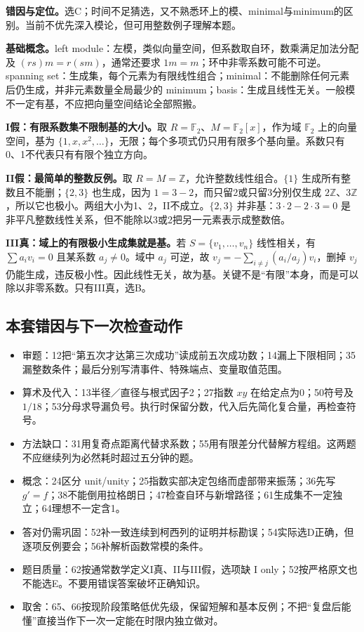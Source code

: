 \documentclass[11pt,a4paper,fontset=fandol]{ctexart}
\begin{document}
\textbf{错因与定位。}选C；时间不足猜选，又不熟悉环上的模、minimal与minimum的区别。当前不优先深入模论，但可用整数例子理解本题。

\textbf{基础概念。}left module：左模，类似向量空间，但系数取自环，数乘满足加法分配及 $(rs)m=r(sm)$，通常还要求 $1m=m$；环中非零系数可能不可逆。spanning set：生成集，每个元素为有限线性组合；minimal：不能删除任何元素后仍生成，并非元素数量全局最少的 minimum；basis：生成且线性无关。一般模不一定有基，不应把向量空间结论全部照搬。

\textbf{I假：有限系数集不限制基的大小。}取 $R=\mathbb F_2$、$M=\mathbb F_2[x]$，作为域 $\mathbb F_2$ 上的向量空间，基为 $\{1,x,x^2,\ldots\}$，无限；每个多项式仍只用有限多个基向量。系数只有0、1不代表只有有限个独立方向。

\textbf{II假：最简单的整数反例。}取 $R=M=\mathbb Z$，允许整数线性组合。$\{1\}$ 生成所有整数且不能删；$\{2,3\}$ 也生成，因为 $1=3-2$，而只留2或只留3分别仅生成 $2\mathbb Z$、$3\mathbb Z$，所以它也极小。两组大小为1、2，II不成立。$\{2,3\}$ 并非基：$3\cdot2-2\cdot3=0$ 是非平凡整数线性关系，但不能除以3或2把另一元素表示成整数倍。

\textbf{III真：域上的有限极小生成集就是基。}若 $S=\{v_1,\ldots,v_n\}$ 线性相关，有 $\sum a_iv_i=0$ 且某系数 $a_j\ne0$。域中 $a_j$ 可逆，故 $v_j=-\sum_{i\ne j}(a_i/a_j)v_i$，删掉 $v_j$ 仍能生成，违反极小性。因此线性无关，故为基。关键不是“有限”本身，而是可以除以非零系数。只有III真，选B。

\subsection{本套错因与下一次检查动作}
\label{ms:summary}
\begin{itemize}
\item 审题：12把“第五次才达第三次成功”读成前五次成功数；14漏上下限相同；35漏整数条件；最后分别写清事件、特殊端点、变量取值范围。
\item 算术及代入：13半径／直径与根式因子2；27指数 $xy$ 在给定点为0；50符号及 $1/18$；53分母求导漏负号。执行时保留分数，代入后先简化复合量，再检查符号。
\item 方法缺口：31用复奇点距离代替求系数；55用有限差分代替解方程组。这两题不应继续列为必然耗时超过五分钟的题。
\item 概念：24区分 unit/unity；25指数实部决定包络而虚部带来振荡；36先写 $g'=f$；38不能倒用拉格朗日；47检查自环与新增路径；61生成集不一定独立；64理想不一定含1。
\item 答对仍需巩固：52补一致连续到柯西列的证明并标勘误；54实际选D正确，但逐项反例要会；56补解析函数常模的条件。
\item 题目质量：62按通常数学定义I真、II与III假，选项缺 I only；52按严格原文也不能选E。不要用错误答案破坏正确知识。
\item 取舍：65、66按现阶段策略低优先级，保留短解和基本反例；不把“复盘后能懂”直接当作下一次一定能在时限内独立做对。
\end{itemize}
\end{document}

